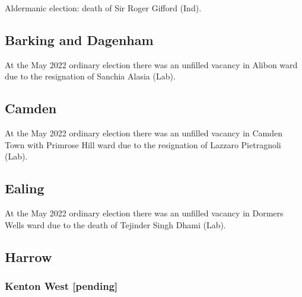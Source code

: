 \documentclass[a4paper,openany]{book}
\begin{document}
\begin{resultsiii}
Aldermanic election: death of Sir Roger Gifford (Ind).

%
\subsection*{Barking and Dagenham}

At the May 2022 ordinary election there was an unfilled vacancy in Alibon ward due to the resignation of Sanchia Alasia (Lab).%

\subsection*{Camden}

At the May 2022 ordinary election there was an unfilled vacancy in Camden Town with Primrose Hill ward due to the resignation of Lazzaro Pietragnoli (Lab).%

\subsection*{Ealing}

At the May 2022 ordinary election there was an unfilled vacancy in Dormers Wells ward due to the death of Tejinder Singh Dhami (Lab).%

\subsection*{Harrow}

\subsubsection*{Kenton West \hspace*{\fill}\nolinebreak[1]%
	\enspace\hspace*{\fill}
	[pending]}


\end{resultsiii}
\end{document}
